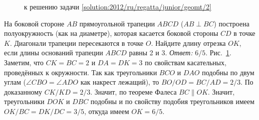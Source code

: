 \ifsolution
\begin{figure}\centering
    \caption{к решению задачи \ref{solution:2012/ru/regatta/junior/geomt/2}}
    \label{fig:solution:2012/ru/regatta/junior/geomt/2}
\end{figure}
\fi %

\problem
На боковой стороне $AB$ прямоугольной трапеции $ABCD$ ($AB \perp BC$)
построена полуокружность (как на диаметре), которая касается боковой стороны
$CD$ в точке $K$.
Диагонали трапеции пересекаются в точке $O$.
Найдите длину отрезка $OK$, если длины оснований трапеции $ABCD$ равны 2 и 3.
\solution
\label{solution:2012/ru/regatta/junior/geomt/2}%
\emph{Ответ:} $6 / 5$.
Рис.~\ref{fig:solution:2012/ru/regatta/junior/geomt/2}.
Заметим, что $CK = BC = 2$ и $DA = DK = 3$ по свойствам касательных,
проведённых к окружности.
Так как треугольники $BCO$ и $DAO$ подобны по двум углам
($\angle CBO = \angle ADO$ как накрест лежащий),
то $BO / OD = BC / AD = 2 / 3$.
По доказанному $CK / KD = 2 / 3$.
Значит, по теореме Фалеса $BC \parallel OK$.
Значит, треугольники $DOK$ и $DBC$ подобны и по свойству подобия треугольников
имеем $OK / BC = DK / DC = 3 / 5$, откуда имеем $OK = 6 / 5$.
\endproblem
